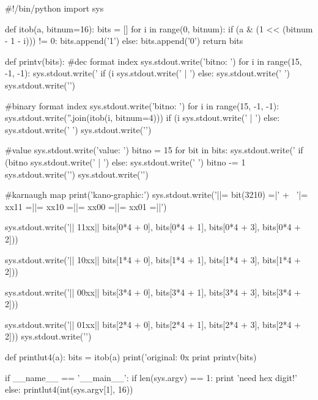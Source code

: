 \begin{pythoncode}
#!/bin/python
import sys

def itob(a, bitnum=16):
    bits = []
    for i in range(0, bitnum):
        if (a & (1 << (bitnum - 1 - i))) != 0:
            bits.append('1')
        else:
            bits.append('0')
    return bits

def printv(bits):
    #dec format index
    sys.stdout.write('bitno: ')
    for i in range(15, -1, -1):
        sys.stdout.write('%
        if (i %
            sys.stdout.write(' | ')
        else:
            sys.stdout.write(' ')
    sys.stdout.write('\n')

    #binary format index
    sys.stdout.write('bitno: ')
    for i in range(15, -1, -1):
        sys.stdout.write(''.join(itob(i, bitnum=4)))
        if (i %
            sys.stdout.write(' | ')
        else:
            sys.stdout.write(' ')
    sys.stdout.write('\n')

    #value
    sys.stdout.write('value: ')
    bitno = 15
    for bit in bits:
        sys.stdout.write('%
        if (bitno %
            sys.stdout.write(' | ')
        else:
            sys.stdout.write(' ')
        bitno -= 1
    sys.stdout.write('\n')
    sys.stdout.write('\n')

    #karnaugh map
    print('kano-graphic:')
    sys.stdout.write('||= bit(3210) =|' + \
            '|=  xx11 =||=  xx10 =||=  xx00 =||=  xx01 =||\n')
    
    sys.stdout.write('||         11xx||%
        bits[0*4 + 0], bits[0*4 + 1], bits[0*4 + 3], bits[0*4 + 2]))
    
    sys.stdout.write('||         10xx||%
        bits[1*4 + 0], bits[1*4 + 1], bits[1*4 + 3], bits[1*4 + 2]))
    
    sys.stdout.write('||         00xx||%
        bits[3*4 + 0], bits[3*4 + 1], bits[3*4 + 3], bits[3*4 + 2]))
    
    sys.stdout.write('||         01xx||%
        bits[2*4 + 0], bits[2*4 + 1], bits[2*4 + 3], bits[2*4 + 2]))
    sys.stdout.write('\n')

def printlut4(a):
    bits = itob(a)
    print('original: 0x%
    print
    printv(bits)

if __name__ == '__main__':
    if len(sys.argv) == 1:
        print 'need hex digit!'
    else:
        printlut4(int(sys.argv[1], 16))

\end{pythoncode}

